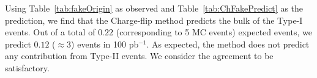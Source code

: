 Using Table~\ref{tab:fakeOrigin} as observed and Table~\ref{tab:ChFakePredict} as the 
prediction, we find that the Charge-flip method predicts the bulk of the Type-I events.
Out of a total of $0.22$ (corresponding to 5 MC events) expected events, we predict 
$0.12$ ($\approx 3$) events in 100 pb$^{-1}$. As expected,
the method does not predict any contribution from Type-II events. 
We consider the agreement to be satisfactory.

